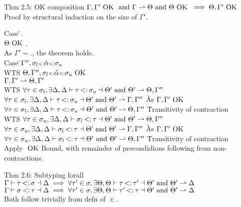 \documentclass{report}
\begin{document}
Thm 2.5: OK composition
$\Gamma,\Gamma' \text{ OK } \text{ and } \Gamma \rightharpoonup \Theta \text{ and } \Theta \text{ OK } \implies \Theta,\Gamma' \text{ OK }$
Proof by structural induction on the size of $\Gamma'$.
\begin{tabbing}
Case \=$.$\\
\> $\Theta \text{ OK }$.\\
\> As $\Gamma' = .$, the theorem holds.\\
Case \=$\Gamma'',\sigma_l {\scriptstyle{<:}} \hat{\alpha} {\scriptstyle{<:}} \sigma_u$\\
\> WTS $\Theta,\Gamma'',\sigma_l {\scriptstyle{<:}} \hat{\alpha} {\scriptstyle{<:}} \sigma_u \text{ OK }$\\
\> $\Gamma,\Gamma' \rightharpoonup \Theta,\Gamma'$\\
\> WTS $\forall \tau \in \sigma_l, \exists \Delta, \Delta \vdash \tau \st \sigma_u \dashv \Theta' \text{ and } \Theta' \contracts \Theta,\Gamma''$\\
\> $\forall \tau \in \sigma_l, \exists \Delta, \Delta \vdash \tau \st \sigma_u \dashv \Theta' \text{ and } \Theta' \contracts \Gamma,\Gamma''$ \` As $\Gamma,\Gamma'\text{ OK }$\\
\> $\forall \tau \in \sigma_l, \exists \Delta, \Delta \vdash \tau \st \sigma_u \dashv \Theta' \text{ and } \Theta' \contracts \Theta,\Gamma''$ \` Transitivity of contraction\\
\> WTS $\forall \tau \in \sigma_u, \exists \Delta, \Delta \vdash \sigma_l \st \tau \dashv \Theta' \text{ and } \Theta' \contracts \Theta,\Gamma''$\\
\> $\forall \tau \in \sigma_u, \exists \Delta, \Delta \vdash \sigma_l \st \tau \dashv \Theta' \text{ and } \Theta' \contracts \Gamma,\Gamma''$ \` As $\Gamma,\Gamma'\text{ OK }$\\
\> $\forall \tau \in \sigma_u, \exists \Delta, \Delta \vdash \sigma_l \st \tau \dashv \Theta' \text{ and } \Theta' \contracts \Theta,\Gamma''$ \` Transitivity of contraction\\
\> Apply $\text{ OK }$Bound, with remainder of precondidions following from non-contractions.\\
\end{tabbing}

Thm 2.6: Subtyping forall
$\Gamma \vdash \tau \st \sigma \dashv \Delta \implies \forall \tau' \in \sigma, \exists \Theta, \Theta \vdash \tau \st \tau' \dashv \Theta' \text{ and } \Theta' \contracts \Delta$\\
$\Gamma \vdash \sigma \st \tau \dashv \Delta \implies \forall \tau' \in \sigma, \exists \Theta, \Theta \vdash \tau' \st \tau \dashv \Theta' \text{ and } \Theta' \contracts \Delta$\\
Both follow trivially from defn of $\in$. 
\end{document}
